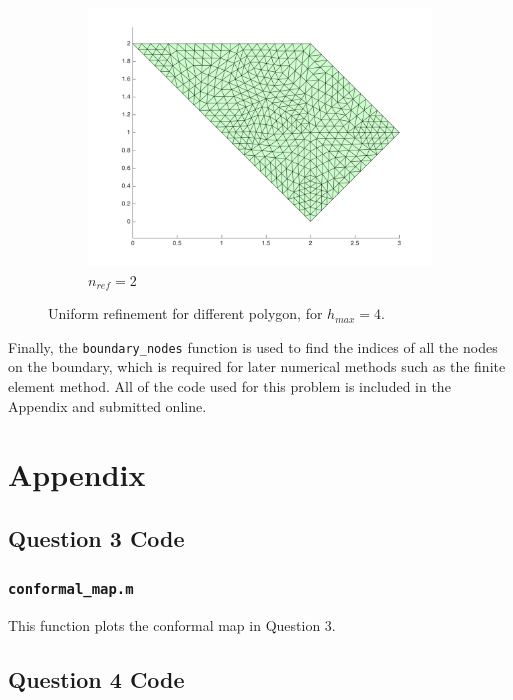 \documentclass[10pt]{article}
\begin{document}
\begin{figure}[H]
\begin{subfigure}[b]{0.35\textwidth}
                \includegraphics[width=\textwidth]{refine-B2.png}
                \caption{\(n_{ref}=2\)}
        \end{subfigure}%
        \caption{Uniform refinement for different polygon, for \(h_{max}=4\).}
        \label{fig:2}
\end{figure}

Finally, the {\tt boundary\_nodes} function is used to find the indices of all the nodes on the boundary, which is required for later numerical methods such as the finite element method. All of the code used for this problem is included in the Appendix and submitted online. 

\section{Appendix}

\subsection{Question 3 Code}
\subsubsection{{\tt conformal\_map.m}}

This function plots the conformal map in Question 3.



\subsection{Question 4 Code}
\end{document}
